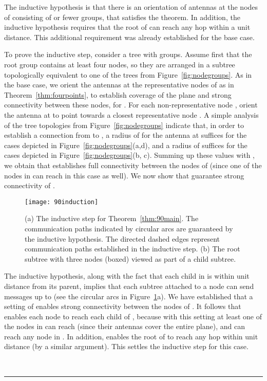 \documentclass[11pt]{article}
\newcommand{\qed}{\rule{0.5em}{1.5ex}}
\newcommand{\fqed}{{\hfill~\qed}}
\newenvironment{proof}{{\noindent \bf Proof.}}
                      {{\hfill \fqed} \vspace{1em}}
\begin{document}
\begin{proof}
The inductive hypothesis is that there is an orientation of antennas at the nodes
of  consisting of  or fewer groups, that satisfies the theorem.
In addition, the inductive hypothesis requires that the root of 
can reach any hop within a unit distance. This additional requirement was already
established for the base case.

To prove the inductive step, consider a tree  with  groups. Assume first
that the root group contains at least four nodes, so they are arranged in a subtree
 topologically equivalent to
one of the trees from Figure~\ref{fig:nodegroups}.
As in the base case, we orient the antennas at the representative nodes of
 as in Theorem~\ref{thm:fourpoints}, to establish coverage of the plane and
strong connectivity between these nodes, for .
For each non-representative node , orient the antenna at  to point towards
a closest representative node .
A simple analysis of the tree topologies from Figure~\ref{fig:nodegroups}
indicate that, in order to establish a connection from  to , a
radius of  for the antenna at  suffices for the cases depicted in
Figure~\ref{fig:nodegroups}(a,d), and a radius of  suffices for the cases depicted
in Figure~\ref{fig:nodegroups}(b, c). Summing up these values with ,
we obtain that  establishes full connectivity between the nodes of 
(since one of the nodes in  can reach  in this case as well).
We now show that  guarantee strong connectivity of .

\begin{figure}[hptb]
\centering
\texttt{[image: 90induction]}
\caption{(a) The inductive step for Theorem~\ref{thm:90main}. The communication paths indicated by circular arcs are guaranteed by the inductive hypothesis. The directed dashed edges represent communication paths established in the inductive step. (b) The root subtree with three nodes (boxed) viewed as part of a child subtree.}
\label{fig:90induction}
\end{figure}

The inductive hypothesis, along with the fact that each child in  is
within unit distance from its parent, implies that each subtree attached to a node
 can send messages up to 
(see the circular arcs in Figure~\ref{fig:90induction}a).
We have established that a setting of  enables strong connectivity
between the nodes of . It follows that  enables each node
 to reach each child  of , because with this setting at
least one of the nodes in  can reach  (since their antennas cover the entire plane),
and  can reach any node in .
In addition,  enables the root of  to reach any hop
within unit distance (by a similar argument).
This settles the inductive step for this case.


\end{proof}
\end{document}
